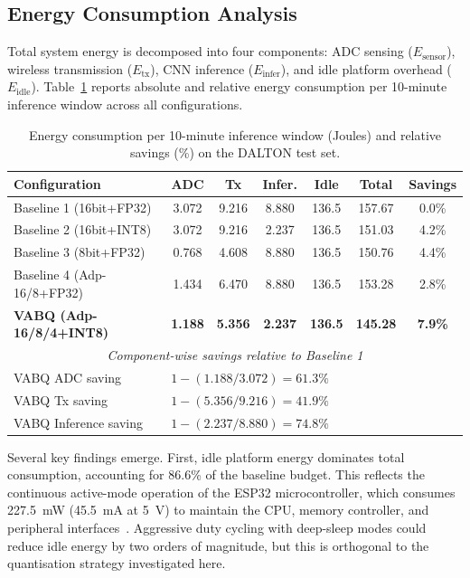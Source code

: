 \subsection{Energy Consumption Analysis}
\label{sec:res_energy}

Total system energy is decomposed into four components: ADC sensing (\(E_{\text{sensor}}\)), wireless transmission (\(E_{\text{tx}}\)), CNN inference (\(E_{\text{infer}}\)), and idle platform overhead (\(E_{\text{idle}}\)). Table~\ref{tab:energy} reports absolute and relative energy consumption per 10-minute inference window across all configurations.

\begin{table}[H]
\centering
\caption{Energy consumption per 10-minute inference window (Joules) and relative savings (\%) on the DALTON test set.}
\label{tab:energy}
\begin{tabular}{@{}lcccccc@{}}
\toprule
\textbf{Configuration} & \textbf{ADC} & \textbf{Tx} & \textbf{Infer.} & \textbf{Idle} & \textbf{Total} & \textbf{Savings} \\
\midrule
Baseline 1 (16bit+FP32) & 3.072 & 9.216 & 8.880 & 136.5 & 157.67 & 0.0\% \\
Baseline 2 (16bit+INT8) & 3.072 & 9.216 & 2.237 & 136.5 & 151.03 & 4.2\% \\
Baseline 3 (8bit+FP32) & 0.768 & 4.608 & 8.880 & 136.5 & 150.76 & 4.4\% \\
Baseline 4 (Adp-16/8+FP32) & 1.434 & 6.470 & 8.880 & 136.5 & 153.28 & 2.8\% \\
\textbf{VABQ (Adp-16/8/4+INT8)} & \textbf{1.188} & \textbf{5.356} & \textbf{2.237} & \textbf{136.5} & \textbf{145.28} & \textbf{7.9\%} \\
\midrule
\multicolumn{7}{c}{\textit{Component-wise savings relative to Baseline 1}} \\
\midrule
VABQ ADC saving & \multicolumn{5}{l}{$1 - (1.188 / 3.072) = 61.3\%$} \\
VABQ Tx saving & \multicolumn{5}{l}{$1 - (5.356 / 9.216) = 41.9\%$} \\
VABQ Inference saving & \multicolumn{5}{l}{$1 - (2.237 / 8.880) = 74.8\%$} \\
\bottomrule
\end{tabular}
\end{table}

Several key findings emerge. First, idle platform energy dominates total consumption, accounting for 86.6\% of the baseline budget. This reflects the continuous active-mode operation of the ESP32 microcontroller, which consumes 227.5~mW (45.5~mA at 5~V) to maintain the CPU, memory controller, and peripheral interfaces~\cite{esp32power2025}. Aggressive duty cycling with deep-sleep modes could reduce idle energy by two orders of magnitude, but this is orthogonal to the quantisation strategy investigated here.

